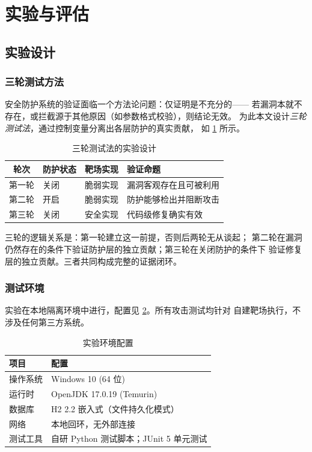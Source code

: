 \section{实验与评估}
\label{sec:evaluation}

\subsection{实验设计}

\subsubsection{三轮测试方法}

安全防护系统的验证面临一个方法论问题：仅证明是不充分的——
若漏洞本就不存在，或拦截源于其他原因（如参数格式校验），则结论无效。
为此本文设计\emph{三轮测试法}，通过控制变量分离出各层防护的真实贡献，
如 \cref{tab:three-round} 所示。

\begin{table}[htbp]
\centering
\caption{三轮测试法的实验设计}
\label{tab:three-round}
\small
\begin{tabular}{@{}c l l l@{}}
\toprule
\textbf{轮次} & \textbf{防护状态} & \textbf{靶场实现} & \textbf{验证命题} \\
\midrule
第一轮 & 关闭 & 脆弱实现 & 漏洞客观存在且可被利用 \\
第二轮 & 开启 & 脆弱实现 & 防护能够检出并阻断攻击 \\
第三轮 & 关闭 & 安全实现 & 代码级修复确实有效 \\
\bottomrule
\end{tabular}
\end{table}

三轮的逻辑关系是：第一轮建立这一前提，否则后两轮无从谈起；
第二轮在漏洞仍然存在的条件下验证防护层的独立贡献；第三轮在关闭防护的条件下
验证修复层的独立贡献。三者共同构成完整的证据闭环。

\subsubsection{测试环境}

实验在本地隔离环境中进行，配置见 \cref{tab:test-env}。所有攻击测试均针对
自建靶场执行，不涉及任何第三方系统。

\begin{table}[htbp]
\centering
\caption{实验环境配置}
\label{tab:test-env}
\small
\begin{tabular}{@{}l l@{}}
\toprule
\textbf{项目} & \textbf{配置} \\
\midrule
操作系统   & Windows 10 (64 位) \\
运行时     & OpenJDK 17.0.19 (Temurin) \\
数据库     & H2 2.2 嵌入式（文件持久化模式） \\
网络       & 本地回环，无外部连接 \\
测试工具   & 自研 Python 测试脚本；JUnit 5 单元测试 \\
\bottomrule
\end{tabular}
\end{table}

